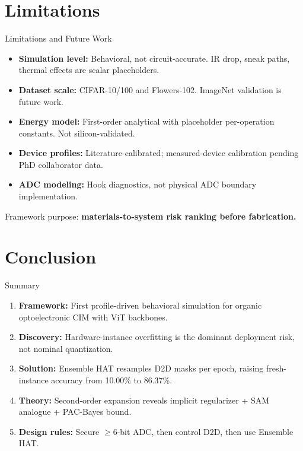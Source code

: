 \documentclass[aspectratio=169,11pt]{beamer}
\begin{document}
\section{Limitations}

\begin{frame}{Limitations and Future Work}
  \begin{itemize}
    \item \textbf{Simulation level:} Behavioral, not circuit-accurate. IR drop, sneak paths, thermal effects are scalar placeholders.
    \item \textbf{Dataset scale:} CIFAR-10/100 and Flowers-102. ImageNet validation is future work.
    \item \textbf{Energy model:} First-order analytical with placeholder per-operation constants. Not silicon-validated.
    \item \textbf{Device profiles:} Literature-calibrated; measured-device calibration pending PhD collaborator data.
    \item \textbf{ADC modeling:} Hook diagnostics, not physical ADC boundary implementation.
  \end{itemize}
  \vfill
  \centering
  Framework purpose: \textbf{materials-to-system risk ranking before fabrication.}
\end{frame}

\section{Conclusion}

\begin{frame}{Summary}
  \begin{enumerate}
    \item \textbf{Framework:} First profile-driven behavioral simulation for organic optoelectronic CIM with ViT backbones.
    \item \textbf{Discovery:} Hardware-instance overfitting is the dominant deployment risk, not nominal quantization.
    \item \textbf{Solution:} Ensemble HAT resamples D2D masks per epoch, raising fresh-instance accuracy from 10.00\% to 86.37\%.
    \item \textbf{Theory:} Second-order expansion reveals implicit regularizer + SAM analogue + PAC-Bayes bound.
    \item \textbf{Design rules:} Secure $\geq$6-bit ADC, then control D2D, then use Ensemble HAT.
  \end{enumerate}
\end{frame}
\end{document}
